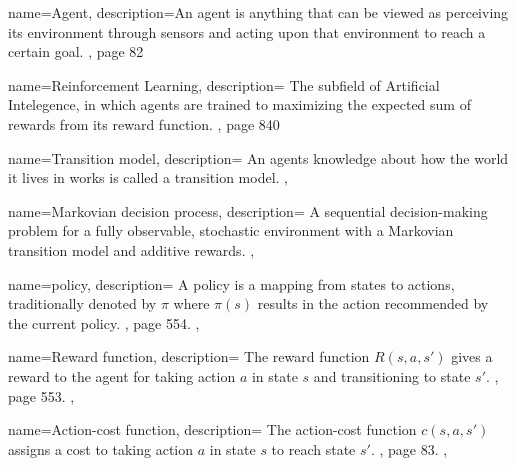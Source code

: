 {
    name={Agent},
    description={An agent is anything that can be viewed as perceiving its environment through sensors and acting upon that environment to reach a certain goal. \cite{rn2022aima}, page 82}
}

{
    name={Reinforcement Learning},
    description={
        The subfield of Artificial Intelegence, in which agents are trained to maximizing the expected sum of rewards from its reward function. \cite{rn2022aima}, page 840
    }
}


{
    name={Transition model},
    description={
        An agents knowledge about how the world it lives in works is called a transition model. 
    },
}

{
    name={Markovian decision process},
    description={
        A sequential decision-making problem for a fully observable, stochastic environment with a Markovian transition model and additive rewards. 
    },
}


{
    name={policy},
    description={
        A policy is a mapping from states to actions, traditionally denoted by $\pi$ where $\pi(s)$ results in the action recommended by the current policy. \cite{rn2022aima}, page 554.
    },
}


{
    name={Reward function},
    description={
        The reward function $R(s, a, s')$ gives a reward to the agent for taking action $a$ in state $s$ and transitioning to state $s'$. \cite{rn2022aima}, page 553.
    },
}

{
    name={Action-cost function},
    description={
        The action-cost function $c(s, a, s')$ assigns a cost to taking action $a$ in state $s$ to reach state $s'$. \cite{rn2022aima}, page 83.
    },
}